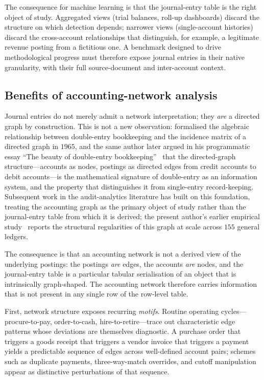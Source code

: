 The consequence for machine learning is that the journal-entry table
is the right object of study.  Aggregated views (trial balances,
roll-up dashboards) discard the structure on which detection depends;
narrower views (single-account histories) discard the cross-account
relationships that distinguish, for example, a legitimate revenue
posting from a fictitious one.  A benchmark designed to drive
methodological progress must therefore expose journal entries in their
native granularity, with their full source-document and
inter-account context.

\subsection{Benefits of accounting-network analysis}
\label{sec:introduction:network-benefits}

Journal entries do not merely admit a network interpretation; they
\emph{are} a directed graph by construction.  This is not a new
observation: \citet{ijiri1965incidence} formalised the algebraic
relationship between double-entry bookkeeping and the
incidence matrix of a directed graph in $1965$, and the same author
later argued in his programmatic essay ``The beauty of double-entry
bookkeeping''~\citep{ijiri1993beauty} that the directed-graph
structure---accounts as nodes, postings as directed edges from
credit accounts to debit accounts---is the mathematical signature of
double-entry as an information system, and the property that
distinguishes it from single-entry record-keeping.  Subsequent work
in the audit-analytics literature
\citep{liang2021bookkeeping,guo2022picture,boersma2024audit} has
built on this foundation, treating the accounting graph as the
primary object of study rather than the journal-entry table from
which it is derived; the present author's earlier empirical
study~\citep{ivertowski2024apn} reports the structural regularities
of this graph at scale across $155$ general ledgers.

The consequence is that an accounting network is not a derived view
of the underlying postings: the postings \emph{are} edges, the
accounts \emph{are} nodes, and the journal-entry table is a
particular tabular serialisation of an object that is intrinsically
graph-shaped.  The accounting network therefore carries information
that is not present in any single row of the row-level table.

First, network structure exposes recurring \emph{motifs}.  Routine
operating cycles---procure-to-pay, order-to-cash, hire-to-retire---trace
out characteristic edge patterns whose deviations are themselves
diagnostic.  A purchase order that triggers a goods receipt that
triggers a vendor invoice that triggers a payment yields a
predictable sequence of edges across well-defined account pairs;
schemes such as duplicate payments, three-way-match overrides, and
cutoff manipulation appear as distinctive perturbations of that
sequence.

